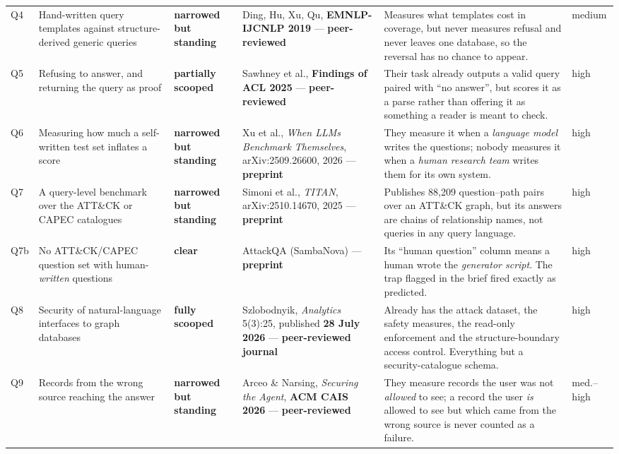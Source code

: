 \documentclass[11pt,a4paper]{article}
\newcommand{\vkilled}{\textcolor{killed}{\textbf{fully scooped}}}
\newcommand{\vpartial}{\textcolor{partial}{\textbf{partially scooped}}}
\newcommand{\vstanding}{\textcolor{standing}{\textbf{narrowed but standing}}}
\newcommand{\vclear}{\textcolor{clear}{\textbf{clear}}}
\begin{document}
\begin{center}
\begin{longtable}{@{}p{0.6cm}>{\RaggedRight}p{2.7cm}>{\RaggedRight}p{2.2cm}>{\RaggedRight}p{4.1cm}>{\RaggedRight}p{2.9cm}>{\RaggedRight}p{1.2cm}@{}}
Q4 & Hand-written query templates against structure-derived generic queries &
\vstanding &
Ding, Hu, Xu, Qu, \textbf{EMNLP-IJCNLP 2019} --- \textbf{peer-reviewed} &
Measures what templates cost in coverage, but never measures refusal and never leaves one database, so the reversal has no chance to appear. & medium \\

Q5 & Refusing to answer, and returning the query as proof &
\vpartial &
Sawhney et al., \textbf{Findings of ACL 2025} --- \textbf{peer-reviewed} &
Their task already outputs a valid query paired with ``no answer'', but scores it as a parse rather than offering it as something a reader is meant to check. & high \\

Q6 & Measuring how much a self-written test set inflates a score &
\vstanding &
Xu et al., \emph{When LLMs Benchmark Themselves}, arXiv:2509.26600, 2026 --- \textbf{preprint} &
They measure it when a \emph{language model} writes the questions; nobody measures it when a \emph{human research team} writes them for its own system. & high \\

Q7 & A query-level benchmark over the ATT\&CK or CAPEC catalogues &
\vstanding &
Simoni et al., \emph{TITAN}, arXiv:2510.14670, 2025 --- \textbf{preprint} &
Publishes 88{,}209 question--path pairs over an ATT\&CK graph, but its answers are chains of relationship names, not queries in any query language. & high \\

Q7b & No ATT\&CK/CAPEC question set with human-\emph{written} questions &
\vclear &
AttackQA (SambaNova) --- \textbf{preprint} &
Its ``human question'' column means a human wrote the \emph{generator script}. The trap flagged in the brief fired exactly as predicted. & high \\

Q8 & Security of natural-language interfaces to graph databases &
\vkilled &
Szlobodnyik, \emph{Analytics} 5(3):25, published \textbf{28 July 2026} --- \textbf{peer-reviewed journal} &
Already has the attack dataset, the safety measures, the read-only enforcement and the structure-boundary access control. Everything but a security-catalogue schema. & high \\

Q9 & Records from the wrong source reaching the answer &
\vstanding &
Arceo \& Narsing, \emph{Securing the Agent}, \textbf{ACM CAIS 2026} --- \textbf{peer-reviewed} &
They measure records the user was not \emph{allowed} to see; a record the user \emph{is} allowed to see but which came from the wrong source is never counted as a failure. & med.--high \\

\bottomrule
\end{longtable}
\end{center}
\end{document}
